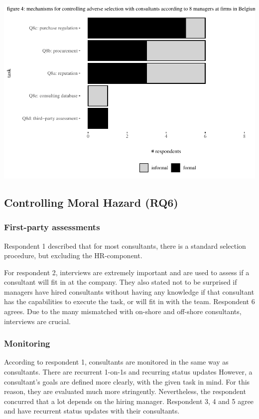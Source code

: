 \documentclass[12pt]{article}
\begin{document}
\begin{center}\includegraphics[width=0.75\linewidth]{2_ams_five_pager_files/figure-latex/unnamed-chunk-6-1} \end{center}

\subsection{Controlling Moral Hazard
(RQ6)}\label{controlling-moral-hazard-rq6}

\subsubsection{First-party assessments}\label{first-party-assessments-1}

Respondent 1 described that for most consultants, there is a standard
selection procedure, but excluding the HR-component.

For respondent 2, interviews are extremely important and are used to
assess if a consultant will fit in at the company. They also stated not
to be surprised if managers have hired consultants without having any
knowledge if that consultant has the capabilities to execute the task,
or will fit in with the team. Respondent 6 agrees. Due to the many
mismatched with on-shore and off-shore consultants, interviews are
crucial.

\subsubsection{Monitoring}\label{monitoring-1}

According to respondent 1, consultants are monitored in the same way as
consultants. There are recurrent 1-on-1s and recurring status updates
However, a consultant's goals are defined more clearly, with the given
task in mind. For this reason, they are evaluated much more stringently.
Nevertheless, the respondent concurred that a lot depends on the hiring
manager. Respondent 3, 4 and 5 agree and have recurrent status updates
with their consultants.
\end{document}
